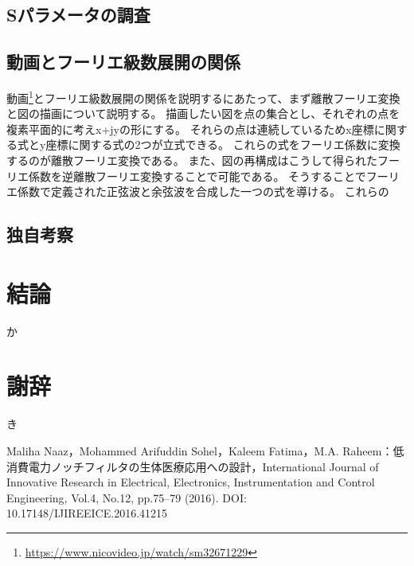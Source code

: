 \documentclass[11pt,dvipdfmx]{jarticle}
\begin{document}
\subsection{Sパラメータの調査}

\subsection{動画とフーリエ級数展開の関係}
動画\footnote{\url{https://www.nicovideo.jp/watch/sm32671229}}とフーリエ級数展開の関係を説明するにあたって、まず離散フーリエ変換と図の描画について説明する。
描画したい図を点の集合とし、それぞれの点を複素平面的に考えx+jyの形にする。
それらの点は連続しているためx座標に関する式とy座標に関する式の2つが立式できる。
これらの式をフーリエ係数に変換するのが離散フーリエ変換である。
また、図の再構成はこうして得られたフーリエ係数を逆離散フーリエ変換することで可能である。
そうすることでフーリエ係数で定義された正弦波と余弦波を合成した一つの式を導ける。
これらの
\subsection{独自考察}
\section{結論}
か

\section{謝辞}
き


\begin{thebibliography}{99}
 Maliha Naaz，Mohammed Arifuddin Sohel，Kaleem Fatima，M.A. Raheem：低消費電力ノッチフィルタの生体医療応用への設計，International Journal of Innovative Research in Electrical, Electronics, Instrumentation and Control Engineering, Vol.4, No.12, pp.75–79 (2016). DOI: 10.17148/IJIREEICE.2016.41215
\end{thebibliography}
\end{document}
